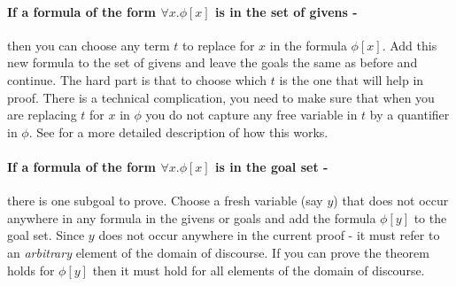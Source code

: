 \documentclass[11pt]{article}
\newcommand{\rbreak}{\ \\}
\newcommand{\NamedConditionalSequentRule}[4]{{\mbox{{\begin{tabular}{c} {\mbox{$#1$}}\vspace{.25em}\\ \hline \vspace{.25em} {\mbox{$#2$}} \end{tabular}}{\hspace{.5em}{#3}{\hspace{.25in}{#4}}}}}}
\begin{document}
\paragraph{If a formula of the form $\forall{}x.\phi[x]$ is in the set of
  givens -} then you can choose any term $t$ to replace for $x$ in the formula
$\phi[x]$. Add this new formula to the set of givens and leave the goals the
same as before and continue.  The hard part is that to choose which $t$ is the
one that will help in proof.  There is a technical complication, you need to
make sure that when you are replacing $t$ for $x$ in $\phi$ you do not
capture any free variable in $t$ by a quantifier in $\phi$.  See
\cite{Caldwell_Discrete} for a more detailed description of how this works.





\paragraph{If a formula of the form $\forall{}x.\phi[x]$ is in the goal set - }
there is one subgoal to prove.  Choose a fresh variable (say $y$) that does not
occur anywhere in any formula in the givens or goals and add the formula
$\phi[y]$ to the goal set.  Since $y$ does not occur anywhere in the current
proof - it must refer to an {\em{arbitrary}} element of the domain of
discourse.  If you can prove the theorem holds for $\phi[y]$ then it must hold
for all elements of the domain of discourse.
\end{document}
